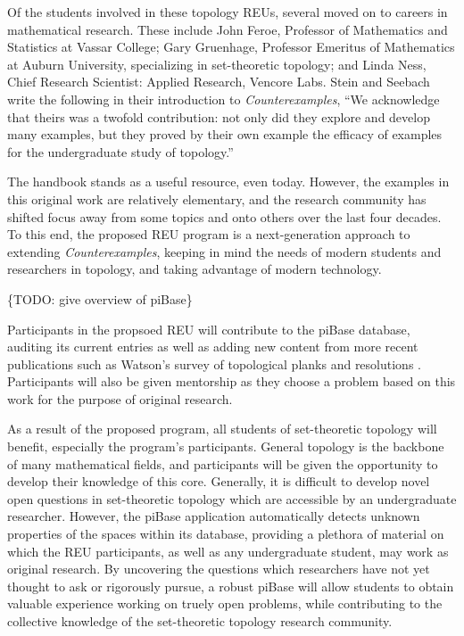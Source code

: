   Of the students involved in these topology REUs, several moved on to careers
  in mathematical research. These include John Feroe,
  Professor of Mathematics and Statistics at Vassar College;
  Gary Gruenhage, Professor Emeritus of Mathematics at Auburn University,
  specializing in set-theoretic topology; and Linda Ness,
  Chief	Research Scientist:	Applied	Research,	Vencore	Labs. Stein and
  Seebach write the following in their introduction to \textit{Counterexamples},
  ``We acknowledge that theirs was a twofold contribution: not only did
  they explore and develop many examples, but they proved by their own
  example the efficacy of examples for the undergraduate study of topology.''

  The handbook stands as a useful resource, even today.
  However, the examples in this original work are relatively elementary,
  and the research community has shifted focus
  away from some topics and onto others over the last four decades.
  To this end,
  the proposed REU program is a next-generation approach to extending
  \textit{Counterexamples}, keeping in mind the needs of
  modern students and researchers in topology, and taking advantage of modern
  technology.

  \{TODO: give overview of piBase\}

  Participants in the propsoed REU will contribute to the piBase database, auditing
  its current entries as well as adding new content from more recent
  publications such as Watson's survey of topological planks and
  resolutions \cite{MR1229141}. Participants will also be given mentorship
  as they choose a problem based on this work for the purpose of original
  research.

  As a result of the proposed program, all students of set-theoretic topology
  will benefit, especially the program's participants. General topology
  is the backbone of many mathematical fields, and participants will be
  given the opportunity to develop their knowledge of this core.
  Generally, it is difficult to develop novel open questions in set-theoretic
  topology which are accessible by an undergraduate researcher. However,
  the piBase application automatically detects unknown properties of
  the spaces within its database, providing a plethora of material
  on which the REU participants, as well as any undergraduate student, may
  work as original research. By uncovering the questions which researchers
  have not yet thought to ask or rigorously pursue, a robust piBase
  will allow students to obtain valuable experience working on truely
  open problems, while contributing to the collective knowledge of the
  set-theoretic topology research community.

